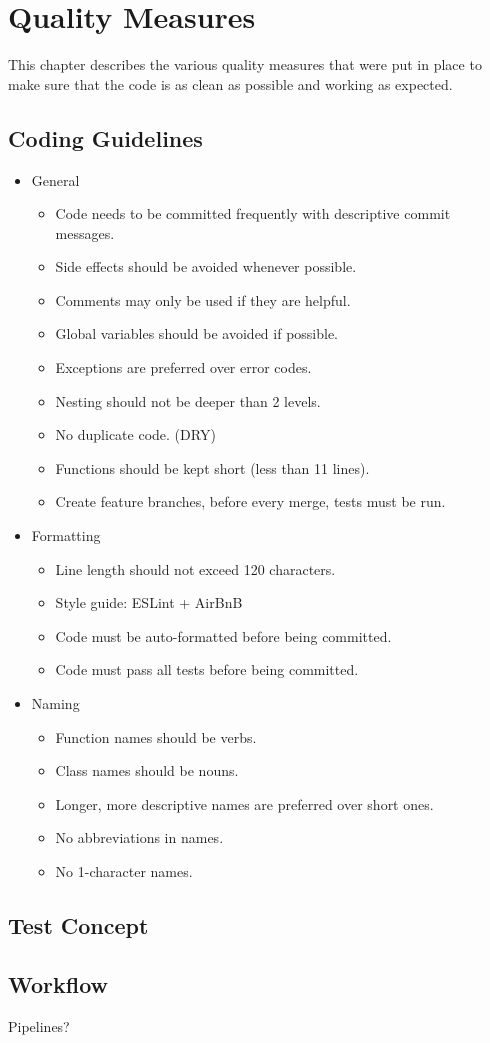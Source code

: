 \chapter{Quality Measures}

This chapter describes the various quality measures that were put in place to make sure that the code is as clean as possible and working as expected.

\section{Coding Guidelines}

\begin{itemize}
    \item General
    \begin{itemize}
        \item Code needs to be committed frequently with descriptive commit messages.
        \item Side effects should be avoided whenever possible.
        \item Comments may only be used if they are helpful.
        \item Global variables should be avoided if possible.
        \item Exceptions are preferred over error codes.
        \item Nesting should not be deeper than 2 levels.
        \item No duplicate code. (DRY)
        \item Functions should be kept short (less than 11 lines).
        \item Create feature branches, before every merge, tests must be run.
    \end{itemize}
    \item Formatting
    \begin{itemize}
        \item Line length should not exceed 120 characters.
        \item Style guide: ESLint + AirBnB
        \item Code must be auto-formatted before being committed.
        \item Code must pass all tests before being committed.
    \end{itemize}
    \item Naming
    \begin{itemize}
        \item Function names should be verbs.
        \item Class names should be nouns.
        \item Longer, more descriptive names are preferred over short ones.
        \item No abbreviations in names.
        \item No 1-character names.
    \end{itemize}
\end{itemize}

\section{Test Concept}

\section{Workflow}

Pipelines?
